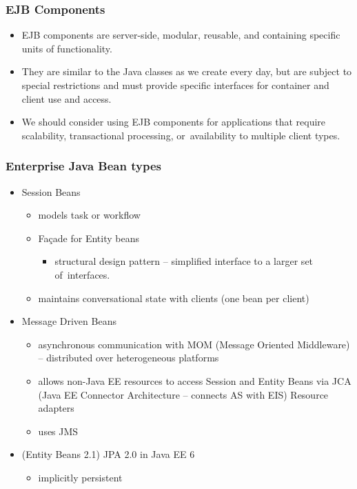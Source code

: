 \documentclass[10pt,xcolor=pdflatex]{beamer}
\begin{document}
\begin{frame}\frametitle{EJB Components}
	\begin{itemize}
		\item EJB components are server-side, modular, reusable, and containing specific units of functionality.
		\item They are similar to the Java classes as we create every day, but are subject to special restrictions and must provide specific interfaces for container and client use and access.
		\item We should consider using EJB components for applications that require scalability, transactional processing, or~availability to multiple client types.
	\end{itemize}
\end{frame}


\begin{frame}\frametitle{Enterprise Java Bean types}
	\begin{itemize}
		\item Session Beans
          \begin{itemize}
        	\item models task or workflow
        	\item Façade for Entity beans
              \begin{itemize}
                \item structural design pattern -- simplified interface to a larger set of~interfaces.
              \end{itemize}
        	\item maintains conversational state with clients (one bean per client)
          \end{itemize}
		\item Message Driven Beans
          \begin{itemize}
        	\item asynchronous communication with MOM (Message Oriented Middleware) -- distributed over heterogeneous platforms
        	\item allows non-Java EE resources to access Session and Entity Beans via JCA (Java EE Connector Architecture -- connects AS with EIS) Resource adapters
            \item uses JMS
          \end{itemize}
        \item (Entity Beans 2.1) JPA 2.0 in Java EE 6
          \begin{itemize}
            \item implicitly persistent

\end{itemize}
\end{itemize}
\end{frame}
\end{document}
